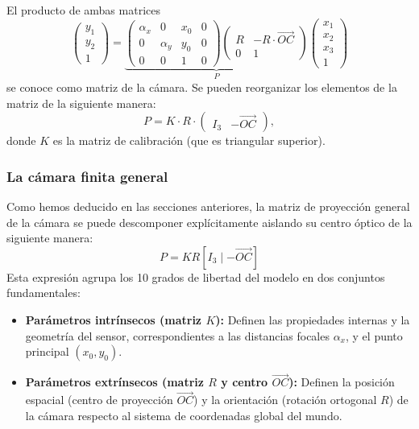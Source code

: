 \documentclass[
10pt, %
a4paper, %
oneside, %
headinclude,footinclude, %
BCOR=5mm, %
]{scrartcl}
\begin{document}
El producto de ambas matrices
\[
    \begin{pmatrix}
        y_1 \\
        y_2 \\
        1
    \end{pmatrix}
    =
    \underbrace{
    \begin{pmatrix}
        \alpha_x & 0 & x_0 & 0 \\
        0 & \alpha_y & y_0 & 0 \\
        0 & 0 & 1 & 0
    \end{pmatrix}
    \left( \begin{array}{c|c}
        R & -R \cdot \vec{OC} \\ \hline
        0 & 1
    \end{array} \right)
    }_{P}
    \begin{pmatrix}
        x_1 \\
        x_2 \\
        x_3 \\
        1
    \end{pmatrix}
\]
se conoce como matriz de la cámara. Se pueden reorganizar los elementos de la matriz de la siguiente manera:
\[
    P = K \cdot R \cdot \begin{pmatrix} I_3 & -\vec{OC} \end{pmatrix},
\]
donde $K$ es la matriz de calibración (que es triangular superior).

\subsubsection{La cámara finita general}

Como hemos deducido en las secciones anteriores, la matriz de proyección general de la cámara se puede descomponer explícitamente aislando su centro óptico de la siguiente manera:
\[
    P = K R [I_3 \mid -\vec{OC}]
\]
Esta expresión agrupa los 10 grados de libertad del modelo en dos conjuntos fundamentales:
\begin{itemize}
    \item \textbf{Parámetros intrínsecos (matriz $K$):} Definen las propiedades internas y la geometría del sensor, correspondientes a las distancias focales $\alpha_x$, y el punto principal $(x_0, y_0)$.
    \item \textbf{Parámetros extrínsecos (matriz $R$ y centro $\vec{OC}$):} Definen la posición espacial (centro de proyección $\vec{OC}$) y la orientación (rotación ortogonal $R$) de la cámara respecto al sistema de coordenadas global del mundo.
\end{itemize}
\end{document}
